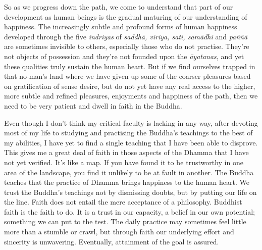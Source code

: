 So as we progress down the path, we come to understand that part of our
development as human beings is the gradual maturing of our understanding
of happiness. The increasingly subtle and profound forms of human
happiness developed through the five \emph{indriyas} of \emph{saddhā, 
viriya, sati, samādhi} and \emph{paññā} are sometimes invisible to
others, especially those who do not practise. They're not objects of
possession and they're not founded upon the \emph{āyatanas}, and yet
these qualities truly sustain the human heart. But if we find ourselves
trapped in that no-man's land where we have given up some of the coarser
pleasures based on gratification of sense desire, but do not yet have
any real access to the higher, more subtle and refined pleasures, 
enjoyments and happiness of the path, then we need to be very patient
and dwell in faith in the Buddha. 

Even though I don't think my critical faculty is lacking in any way, 
after devoting most of my life to studying and practising the Buddha's
teachings to the best of my abilities, I have yet to find a single
teaching that I have been able to disprove. This gives me a great deal
of faith in those aspects of the Dhamma that I have not yet verified. 
It's like a map. If you have found it to be trustworthy in one area of
the landscape, you find it unlikely to be at fault in another. The
Buddha teaches that the practice of Dhamma brings happiness to the human
heart. We trust the Buddha's teachings not by dismissing doubts, but by
putting our life on the line. Faith does not entail the mere acceptance
of a philosophy. Buddhist faith is the faith to do. It is a trust in our
capacity, a belief in our own potential; something we can put to the
test. The daily practice may sometimes feel little more than a stumble
or crawl, but through faith our underlying effort and sincerity is
unwavering. Eventually, attainment of the goal is assured. 

